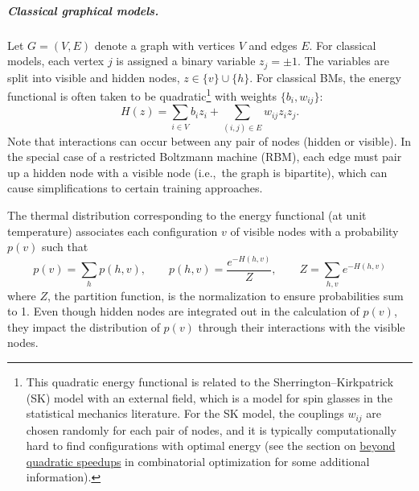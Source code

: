 \begin{refsection}
\subparagraph{Classical graphical models.} Let $G = (V,E)$ denote a graph with vertices $V$ and edges $E$. For classical models, each vertex $j$ is assigned a binary variable $z_j = \pm 1$. The variables are split into visible and hidden nodes,  $z \in \{v\} \cup \{h\}$. For classical BMs, the energy functional is often taken to be quadratic\footnote{This quadratic energy functional is related to the Sherrington--Kirkpatrick (SK) model \cite{sherrington1975solvable} with an external field, which is a model for spin glasses in the statistical mechanics literature. For the SK model, the couplings $w_{ij}$ are chosen randomly for each pair of nodes, and it is typically computationally hard to find configurations with optimal energy (see the section on \hyperref[appl:BeyondGrover]{beyond quadratic speedups} in combinatorial optimization for some additional information).} with weights $\{b_i,w_{ij}\}$:
\begin{equation}\label{eq:EBM_energy}
    H(z)= \sum_{i\in V} b_i z_i+\sum_{(i,j)\in E}w_{ij} z_iz_j. 
\end{equation}
Note that interactions can occur between any pair of nodes (hidden or visible). 
In the special case of a restricted Boltzmann machine (RBM), each edge must pair up a hidden node with a visible node (i.e.,~the graph is bipartite), which can cause simplifications to certain training approaches. 

The thermal distribution corresponding to the energy functional (at unit temperature) associates each configuration $v$ of visible nodes with a probability $p(v)$ such that
\begin{equation}
    p(v) = \sum_h p(h,v), \qquad p(h,v) = \frac{e^{-H(h,v)}}{Z}, \qquad Z = \sum_{h,v} e^{-H(h,v)} 
\end{equation}
where $Z$, the partition function, is the normalization to ensure probabilities sum to 1. Even though hidden nodes are integrated out in the calculation of $p(v)$, they impact the distribution of $p(v)$ through their interactions with the visible nodes. 


\end{refsection}
